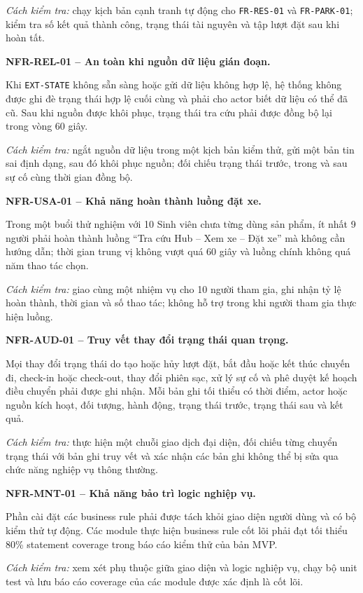 \textit{Cách kiểm tra:} chạy kịch bản cạnh tranh tự động cho \texttt{FR-RES-01} và \texttt{FR-PARK-01}; kiểm tra số kết quả thành công, trạng thái tài nguyên và tập lượt đặt sau khi hoàn tất.

\medskip
\noindent\textbf{NFR-REL-01 -- An toàn khi nguồn dữ liệu gián đoạn.}\par
\nopagebreak[4]
Khi \texttt{EXT-STATE} không sẵn sàng hoặc gửi dữ liệu không hợp lệ, hệ thống không được ghi đè trạng thái hợp lệ cuối cùng và phải cho actor biết dữ liệu có thể đã cũ. Sau khi nguồn được khôi phục, trạng thái tra cứu phải được đồng bộ lại trong vòng 60 giây.

\textit{Cách kiểm tra:} ngắt nguồn dữ liệu trong một kịch bản kiểm thử, gửi một bản tin sai định dạng, sau đó khôi phục nguồn; đối chiếu trạng thái trước, trong và sau sự cố cùng thời gian đồng bộ.

\medskip
\noindent\textbf{NFR-USA-01 -- Khả năng hoàn thành luồng đặt xe.}\par
\nopagebreak[4]
Trong một buổi thử nghiệm với 10 Sinh viên chưa từng dùng sản phẩm, ít nhất 9 người phải hoàn thành luồng ``Tra cứu Hub -- Xem xe -- Đặt xe'' mà không cần hướng dẫn; thời gian trung vị không vượt quá 60 giây và luồng chính không quá năm thao tác chọn.

\textit{Cách kiểm tra:} giao cùng một nhiệm vụ cho 10 người tham gia, ghi nhận tỷ lệ hoàn thành, thời gian và số thao tác; không hỗ trợ trong khi người tham gia thực hiện luồng.

\medskip
\noindent\textbf{NFR-AUD-01 -- Truy vết thay đổi trạng thái quan trọng.}\par
\nopagebreak[4]
Mọi thay đổi trạng thái do tạo hoặc hủy lượt đặt, bắt đầu hoặc kết thúc chuyến đi, check-in hoặc check-out, thay đổi phiên sạc, xử lý sự cố và phê duyệt kế hoạch điều chuyển phải được ghi nhận. Mỗi bản ghi tối thiểu có thời điểm, actor hoặc nguồn kích hoạt, đối tượng, hành động, trạng thái trước, trạng thái sau và kết quả.

\textit{Cách kiểm tra:} thực hiện một chuỗi giao dịch đại diện, đối chiếu từng chuyển trạng thái với bản ghi truy vết và xác nhận các bản ghi không thể bị sửa qua chức năng nghiệp vụ thông thường.

\medskip
\noindent\textbf{NFR-MNT-01 -- Khả năng bảo trì logic nghiệp vụ.}\par
\nopagebreak[4]
Phần cài đặt các business rule phải được tách khỏi giao diện người dùng và có bộ kiểm thử tự động. Các module thực hiện business rule cốt lõi phải đạt tối thiểu 80\% statement coverage trong báo cáo kiểm thử của bản MVP.

\textit{Cách kiểm tra:} xem xét phụ thuộc giữa giao diện và logic nghiệp vụ, chạy bộ unit test và lưu báo cáo coverage của các module được xác định là cốt lõi.
